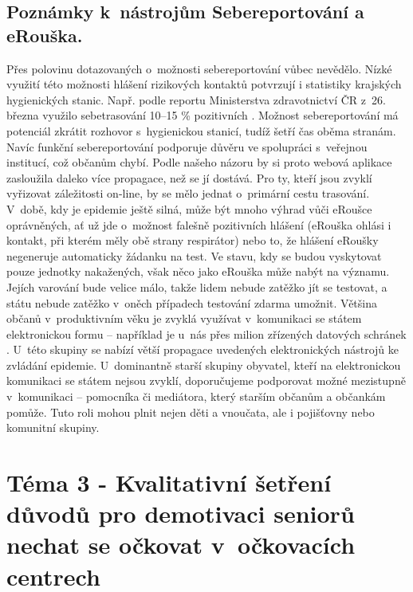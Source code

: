 \subsection*{Poznámky k~nástrojům Sebereportování a eRouška.}
Přes polovinu dotazovaných o~možnosti sebereportování vůbec nevědělo. Nízké vy\-uži\-tí této možnosti hlášení rizikových kontaktů potvrzují i statistiky krajských hygienických stanic. Např. podle reportu Ministerstva zdravotnictví ČR z~26. března využilo sebetrasování 10–15 \% pozitivních \cite{MinisterstvoZdravotnictviCR2021}. Možnost sebereportování má potenciál zkrátit rozhovor s~hygienickou stanicí, tudíž šetří čas oběma stranám. Navíc funkční sebereportování podporuje důvěru ve spolupráci s~veřejnou institucí, což občanům chybí. Podle našeho názoru by si proto webová aplikace zasloužila daleko více propagace, než se jí dostává. Pro ty, kteří jsou zvyklí vyřizovat záležitosti on-line, by se mělo jednat o~primární cestu trasování. 
V~době, kdy je epidemie ještě silná, může být mnoho výhrad vůči eRoušce oprávněných, ať už jde o~možnost falešně pozitivních hlášení (eRouška ohlási i kontakt, při kterém měly obě strany respirátor) nebo to, že hlášení eRoušky negeneruje automaticky žádanku na test. Ve stavu, kdy se budou vyskytovat pouze jednotky nakažených, však něco jako eRouška může nabýt na významu. Jejích varování bude velice málo, takže lidem nebude zatěžko jít se testovat, a státu nebude zatěžko v~oněch případech testování zdarma umožnit. 
Většina občanů v~produktivním věku je zvyklá využívat v~komunikaci se státem elektronickou formu – například je u~nás přes milion zřízených datových schránek \cite{DatoveSchranky2021}. U~této skupiny se nabízí větší propagace uvedených elektronických nástrojů ke zvládání epidemie. U~dominantně starší skupiny obyvatel, kteří na elektronickou komunikaci se státem nejsou zvyklí, doporučujeme podporovat možné mezistupně v~komunikaci – pomocníka či mediátora, který starším občanům a občankám pomůže. Tuto roli mohou plnit nejen děti a vnoučata, ale i pojišťovny nebo komunitní skupiny. 

\section*{Téma 3 - Kvalitativní šetření důvodů pro demotivaci seniorů nechat se očkovat v~očkovacích centrech}

